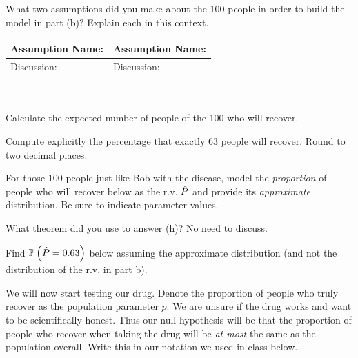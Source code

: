 \documentclass[12pt]{article}
\begin{document}
 What two assumptions did you make about the 100 people in order to build the model in part (b)? Explain each in this context. 

\begin{table}[h]
\centering
\begin{tabular}{l|l}
Assumption Name: \hspace{2.0in} & Assumption Name: \hspace{2.0in} \\ \hline
Discussion: & Discussion: \\ 
& \\
& \\
& \\ 
& \\
& \\
& \\
& \\
\end{tabular}
\end{table}

 Calculate the expected number of people of the 100 who will recover.   

 Compute explicitly the percentage that exactly 63 people will recover. Round to two decimal places.  


 For those 100 people just like Bob with the disease, model the \textit{proportion} of people who will recover below as the r.v. $\hat{P}$ and provide its \textit{approximate} distribution. Be sure to indicate parameter values.

 What theorem did you use to answer (h)? No need to discuss.  

 Find $\mathbb{P}\left(\hat{P} = 0.63\right)$ below assuming the approximate distribution (and not the distribution of the r.v. in part b).  

 We will now start testing our drug. Denote the proportion of people who truly recover as the population parameter $p$. We are unsure if the drug works and want to be scientifically honest. Thus our null hypothesis will be that the proportion of people who recover when taking the drug will be \textit{at most} the same as the population overall. Write this in our notation we used in class below. 
\end{document}
